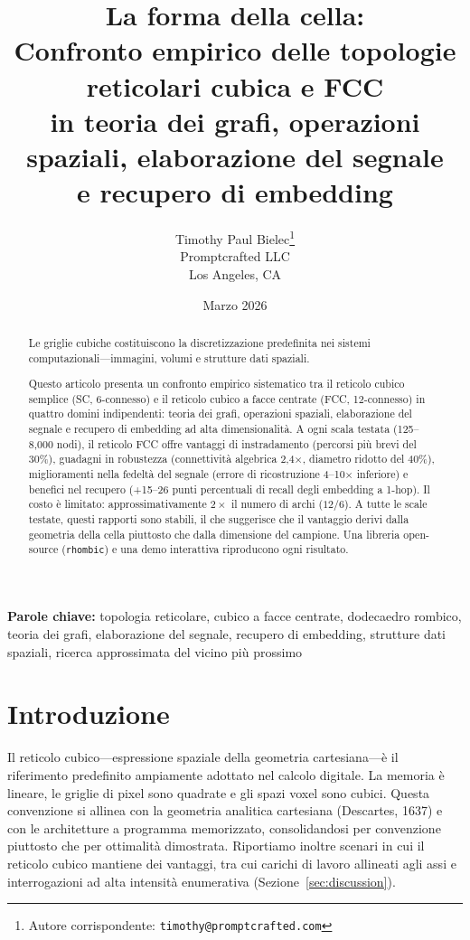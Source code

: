 \documentclass[11pt]{article}
\title{%
  La forma della cella:\\
  Confronto empirico delle topologie reticolari cubica e FCC\\
  in teoria dei grafi, operazioni spaziali, elaborazione del segnale\\
  e recupero di embedding%
}
\author{%
  Timothy Paul Bielec\thanks{Autore corrispondente: \texttt{timothy@promptcrafted.com}}\\
  Promptcrafted LLC\\
  Los Angeles, CA
}
\date{Marzo 2026}
\begin{document}
\maketitle

\begin{abstract}
Le griglie cubiche costituiscono la discretizzazione predefinita nei sistemi
computazionali---immagini, volumi e strutture dati spaziali.

Questo articolo presenta un confronto empirico sistematico tra il reticolo
cubico semplice (SC, 6-connesso) e il reticolo cubico a facce centrate (FCC,
12-connesso) in quattro domini indipendenti: teoria dei grafi, operazioni
spaziali, elaborazione del segnale e recupero di embedding ad alta
dimensionalit\`a. A ogni scala testata (125--8{,}000 nodi), il reticolo FCC
offre vantaggi di instradamento (percorsi pi\`u brevi del 30\%), guadagni
in robustezza (connettivit\`a algebrica 2,4$\times$, diametro ridotto del
40\%), miglioramenti nella fedelt\`a del segnale (errore di ricostruzione
4--10$\times$ inferiore) e benefici nel recupero (+15--26 punti percentuali
di recall degli embedding a 1-hop). Il costo \`e limitato: approssimativamente
$2\times$ il numero di archi ($12/6$). A tutte le scale testate, questi
rapporti sono stabili, il che suggerisce che il vantaggio derivi dalla
geometria della cella piuttosto che dalla dimensione del campione. Una
libreria open-source (\texttt{rhombic}) e una demo interattiva riproducono
ogni risultato.
\end{abstract}

\noindent\textbf{Parole chiave:} topologia reticolare, cubico a facce centrate,
dodecaedro rombico, teoria dei grafi, elaborazione del segnale, recupero di
embedding, strutture dati spaziali, ricerca approssimata del vicino pi\`u
prossimo

\section{Introduzione}
\label{sec:intro}

Il reticolo cubico---espressione spaziale della geometria cartesiana---\`e
il riferimento predefinito ampiamente adottato nel calcolo digitale. La
memoria \`e lineare, le griglie di pixel sono quadrate e gli spazi voxel
sono cubici. Questa convenzione si allinea con la geometria analitica
cartesiana (Descartes, 1637) e con le architetture a programma
memorizzato, consolidandosi per convenzione piuttosto che per ottimalit\`a
dimostrata. Riportiamo inoltre scenari in cui il reticolo cubico mantiene
dei vantaggi, tra cui carichi di lavoro allineati agli assi e interrogazioni
ad alta intensit\`a enumerativa (Sezione~\ref{sec:discussion}).
\end{document}
